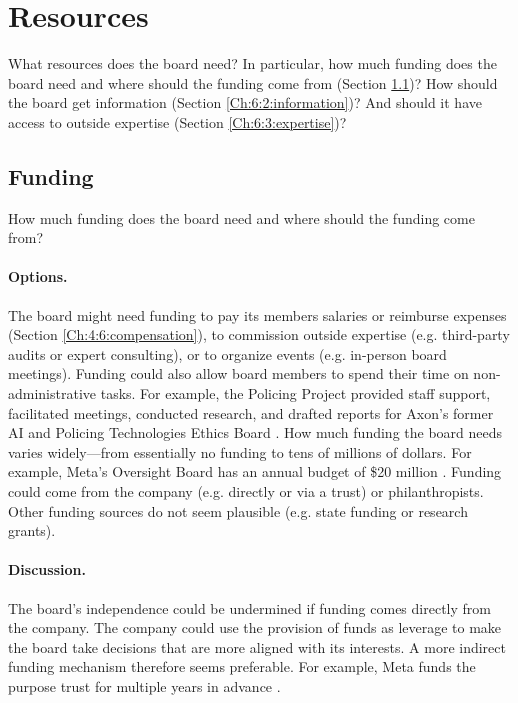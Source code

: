 \documentclass{article}
\begin{document}
\section{Resources}\label{Ch:6:resources}

What resources does the board need? In particular, how much funding does the board need and where should the funding come from (Section \ref{Ch:6:1:funding})? How should the board get information (Section \ref{Ch:6:2:information})? And should it have access to outside expertise (Section \ref{Ch:6:3:expertise})?

\subsection{Funding}\label{Ch:6:1:funding}

How much funding does the board need and where should the funding come from?

\paragraph{Options.} The board might need funding to pay its members salaries or reimburse expenses (Section \ref{Ch:4:6:compensation}), to commission outside expertise (e.g. third-party audits or expert consulting), or to organize events (e.g. in-person board meetings). Funding could also allow board members to spend their time on non-administrative tasks. For example, the Policing Project provided staff support, facilitated meetings, conducted research, and drafted reports for Axon’s former AI and Policing Technologies Ethics Board \cite{policingproject2020reports}. How much funding the board needs varies widely—from essentially no funding to tens of millions of dollars. For example, Meta’s Oversight Board has an annual budget of \$20 million \cite{oversight2022funding}. Funding could come from the company (e.g. directly or via a trust) or philanthropists. Other funding sources do not seem plausible (e.g. state funding or research grants).

\paragraph{Discussion.} The board’s independence could be undermined if funding comes directly from the company. The company could use the provision of funds as leverage to make the board take decisions that are more aligned with its interests. A more indirect funding mechanism therefore seems preferable. For example, Meta funds the purpose trust for multiple years in advance \cite{oversight2022funding}.
\end{document}
